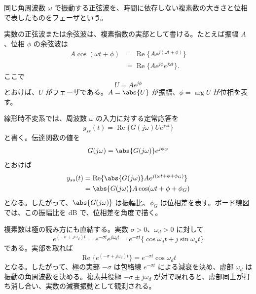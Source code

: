 \begin{definition}[フェーザ]
同じ角周波数 $\omega$ で振動する正弦波を、時間に依存しない複素数の大きさと位相で表したものをフェーザという。
\end{definition}

実数の正弦波または余弦波は、複素指数の実部として書ける。たとえば振幅 $A$、位相 $\phi$ の余弦波は
\begin{align}
  A\cos(\omega t+\phi)
  &=\operatorname{Re}\{A e^{j(\omega t+\phi)}\}\\
  &=\operatorname{Re}\{A e^{j\phi}e^{j\omega t}\}.
\end{align}
ここで
\begin{equation}
  U=Ae^{j\phi}
\end{equation}
とおけば、$U$ がフェーザである。$A=\abs{U}$ が振幅、$\phi=\arg U$ が位相を表す。

線形時不変系では、周波数 $\omega$ の入力に対する定常応答を
\begin{equation}
  y_{ss}(t)=\operatorname{Re}\{G(j\omega)Ue^{j\omega t}\}
\end{equation}
と書く。伝達関数の値を
\begin{equation}
  G(j\omega)=\abs{G(j\omega)}e^{j\phi_G}
\end{equation}
とおけば
\begin{align}
  y_{ss}(t)
  &=\operatorname{Re}\{\abs{G(j\omega)}A
    e^{j(\omega t+\phi+\phi_G)}\}\\
  &=\abs{G(j\omega)}A\cos(\omega t+\phi+\phi_G)
\end{align}
となる。したがって、$\abs{G(j\omega)}$ は振幅比、$\phi_G$ は位相差を表す。ボード線図では、この振幅比を dB で、位相差を角度で描く。

複素数は極の読み方にも直結する。実数 $\sigma>0$、$\omega_d>0$ に対して
\begin{equation}
  e^{(-\sigma+j\omega_d)t}
  =e^{-\sigma t}e^{j\omega_d t}
  =e^{-\sigma t}\{\cos\omega_d t+j\sin\omega_d t\}
\end{equation}
である。実部を取れば
\begin{equation}
  \operatorname{Re}\{e^{(-\sigma+j\omega_d)t}\}
  =e^{-\sigma t}\cos\omega_d t
\end{equation}
となる。したがって、極の実部 $-\sigma$ は包絡線 $e^{-\sigma t}$ による減衰を決め、虚部 $\omega_d$ は振動の角周波数を決める。複素共役極 $-\sigma\pm j\omega_d$ が対で現れると、虚部同士が打ち消し合い、実数の減衰振動として観測される。
